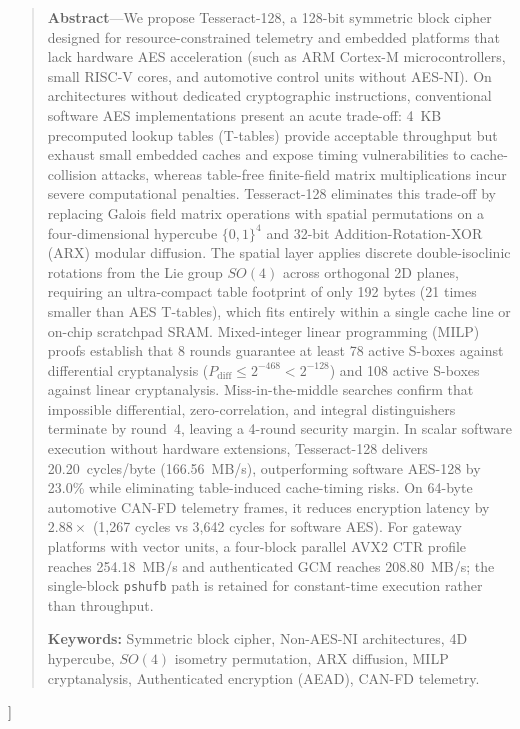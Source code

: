 \documentclass[10pt,twocolumn]{article}
\begin{document}
\begin{@twocolumnfalse}
    \begin{quote}
      \small
      \textbf{Abstract}---We propose Tesseract-128, a 128-bit symmetric block cipher designed for resource-constrained telemetry and embedded platforms that lack hardware AES acceleration (such as ARM Cortex-M microcontrollers, small RISC-V cores, and automotive control units without AES-NI). On architectures without dedicated cryptographic instructions, conventional software AES implementations present an acute trade-off: 4~KB precomputed lookup tables (T-tables) provide acceptable throughput but exhaust small embedded caches and expose timing vulnerabilities to cache-collision attacks, whereas table-free finite-field matrix multiplications incur severe computational penalties. Tesseract-128 eliminates this trade-off by replacing Galois field matrix operations with spatial permutations on a four-dimensional hypercube $\{0,1\}^4$ and 32-bit Addition-Rotation-XOR (ARX) modular diffusion. The spatial layer applies discrete double-isoclinic rotations from the Lie group $SO(4)$ across orthogonal 2D planes, requiring an ultra-compact table footprint of only 192 bytes (21 times smaller than AES T-tables), which fits entirely within a single cache line or on-chip scratchpad SRAM. Mixed-integer linear programming (MILP) proofs establish that 8 rounds guarantee at least 78 active S-boxes against differential cryptanalysis ($P_{\text{diff}} \le 2^{-468} < 2^{-128}$) and 108 active S-boxes against linear cryptanalysis. Miss-in-the-middle searches confirm that impossible differential, zero-correlation, and integral distinguishers terminate by round~4, leaving a 4-round security margin. In scalar software execution without hardware extensions, Tesseract-128 delivers 20.20~cycles/byte (166.56~MB/s), outperforming software AES-128 by 23.0\% while eliminating table-induced cache-timing risks. On 64-byte automotive CAN-FD telemetry frames, it reduces encryption latency by $2.88\times$ (1,267 cycles vs 3,642 cycles for software AES). For gateway platforms with vector units, a four-block parallel AVX2 CTR profile reaches 254.18~MB/s and authenticated GCM reaches 208.80~MB/s; the single-block \texttt{pshufb} path is retained for constant-time execution rather than throughput.
      \vspace{0.3cm}
      
      \noindent\textbf{Keywords:} Symmetric block cipher, Non-AES-NI architectures, 4D hypercube, $SO(4)$ isometry permutation, ARX diffusion, MILP cryptanalysis, Authenticated encryption (AEAD), CAN-FD telemetry.
    \end{quote}
    \vspace{0.6cm}
  \end{@twocolumnfalse}
]
\end{document}
